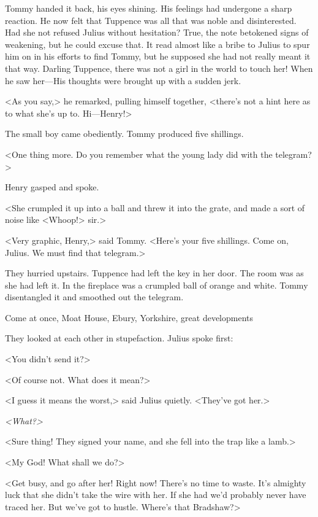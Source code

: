 Tommy handed it back, his eyes shining. His feelings had undergone a sharp reaction. He now felt that Tuppence was all that was noble and disinterested. Had she not refused Julius without hesitation? True, the note betokened signs of weakening, but he could excuse that. It read almost like a bribe to Julius to spur him on in his efforts to find Tommy, but he supposed she had not really meant it that way. Darling Tuppence, there was not a girl in the world to touch her! When he saw her—His thoughts were brought up with a sudden jerk.

<As you say,> he remarked, pulling himself together, <there's not a hint here as to what she's up to. Hi—Henry!>

The small boy came obediently. Tommy produced five shillings.

<One thing more. Do you remember what the young lady did with the telegram?>

Henry gasped and spoke.

<She crumpled it up into a ball and threw it into the grate, and made a sort of noise like <Whoop!> sir.>

<Very graphic, Henry,> said Tommy. <Here's your five shillings. Come on, Julius. We must find that telegram.>

They hurried upstairs. Tuppence had left the key in her door. The room was as she had left it. In the fireplace was a crumpled ball of orange and white. Tommy disentangled it and smoothed out the telegram.

\begin{telegram}[Tommy.]
Come at once, Moat House, Ebury, Yorkshire, great developments
\end{telegram}

They looked at each other in stupefaction. Julius spoke first:

<You didn't send it?>

<Of course not. What does it mean?>

<I guess it means the worst,> said Julius quietly. <They've got her.>

\emph{<What?>}

<Sure thing! They signed your name, and she fell into the trap like a lamb.>

<My God! What shall we do?>

<Get busy, and go after her! Right now! There's no time to waste. It's almighty luck that she didn't take the wire with her. If she had we'd probably never have traced her. But we've got to hustle. Where's that Bradshaw?>


